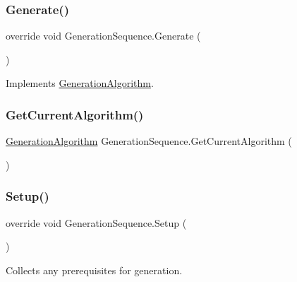 \subsubsection{\texorpdfstring{Generate()}{Generate()}}
{\footnotesize\ttfamily override void Generation\+Sequence.\+Generate (\begin{DoxyParamCaption}{ }\end{DoxyParamCaption})\hspace{0.3cm}{\ttfamily [virtual]}}



Implements \mbox{\hyperlink{class_generation_algorithm_ac2df20f7751c1b480ab958791d5c7d41}{Generation\+Algorithm}}.

\mbox{\label{class_generation_sequence_a09f98429afb3efcaa424397d45847132}} 
\subsubsection{\texorpdfstring{Get\+Current\+Algorithm()}{GetCurrentAlgorithm()}}
{\footnotesize\ttfamily \mbox{\hyperlink{class_generation_algorithm}{Generation\+Algorithm}} Generation\+Sequence.\+Get\+Current\+Algorithm (\begin{DoxyParamCaption}{ }\end{DoxyParamCaption})}

\mbox{\label{class_generation_sequence_ad433bd211eb9ed7e39d6e354c40289ff}} 
\subsubsection{\texorpdfstring{Setup()}{Setup()}}
{\footnotesize\ttfamily override void Generation\+Sequence.\+Setup (\begin{DoxyParamCaption}{ }\end{DoxyParamCaption})\hspace{0.3cm}{\ttfamily [virtual]}}



Collects any prerequisites for generation. 



